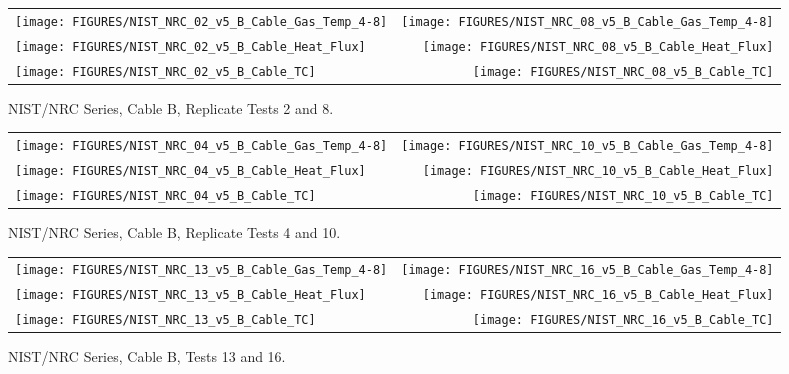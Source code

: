 \begin{figure}[h]
\begin{tabular*}{\textwidth}{l@{\extracolsep{\fill}}r}
\texttt{[image: FIGURES/NIST\_NRC\_02\_v5\_B\_Cable\_Gas\_Temp\_4-8]} &
\texttt{[image: FIGURES/NIST\_NRC\_08\_v5\_B\_Cable\_Gas\_Temp\_4-8]} \\
\texttt{[image: FIGURES/NIST\_NRC\_02\_v5\_B\_Cable\_Heat\_Flux]} &
\texttt{[image: FIGURES/NIST\_NRC\_08\_v5\_B\_Cable\_Heat\_Flux]} \\
\texttt{[image: FIGURES/NIST\_NRC\_02\_v5\_B\_Cable\_TC]} &
\texttt{[image: FIGURES/NIST\_NRC\_08\_v5\_B\_Cable\_TC]}
\end{tabular*}
\caption{NIST/NRC Series, Cable B, Replicate Tests 2 and 8.}
\label{NIST_NRC_B_2_and_8}
\end{figure}

\begin{figure}[h]
\begin{tabular*}{\textwidth}{l@{\extracolsep{\fill}}r}
\texttt{[image: FIGURES/NIST\_NRC\_04\_v5\_B\_Cable\_Gas\_Temp\_4-8]} &
\texttt{[image: FIGURES/NIST\_NRC\_10\_v5\_B\_Cable\_Gas\_Temp\_4-8]} \\
\texttt{[image: FIGURES/NIST\_NRC\_04\_v5\_B\_Cable\_Heat\_Flux]} &
\texttt{[image: FIGURES/NIST\_NRC\_10\_v5\_B\_Cable\_Heat\_Flux]} \\
\texttt{[image: FIGURES/NIST\_NRC\_04\_v5\_B\_Cable\_TC]} &
\texttt{[image: FIGURES/NIST\_NRC\_10\_v5\_B\_Cable\_TC]}
\end{tabular*}
\caption{NIST/NRC Series, Cable B, Replicate Tests 4 and 10.}
\label{NIST_NRC_B_4_and_10}
\end{figure}

\begin{figure}[h]
\begin{tabular*}{\textwidth}{l@{\extracolsep{\fill}}r}
\texttt{[image: FIGURES/NIST\_NRC\_13\_v5\_B\_Cable\_Gas\_Temp\_4-8]} &
\texttt{[image: FIGURES/NIST\_NRC\_16\_v5\_B\_Cable\_Gas\_Temp\_4-8]} \\
\texttt{[image: FIGURES/NIST\_NRC\_13\_v5\_B\_Cable\_Heat\_Flux]} &
\texttt{[image: FIGURES/NIST\_NRC\_16\_v5\_B\_Cable\_Heat\_Flux]} \\
\texttt{[image: FIGURES/NIST\_NRC\_13\_v5\_B\_Cable\_TC]} &
\texttt{[image: FIGURES/NIST\_NRC\_16\_v5\_B\_Cable\_TC]}
\end{tabular*}
\caption{NIST/NRC Series, Cable B, Tests 13 and 16.}
\label{NIST_NRC_B_13_and_16}
\end{figure}

